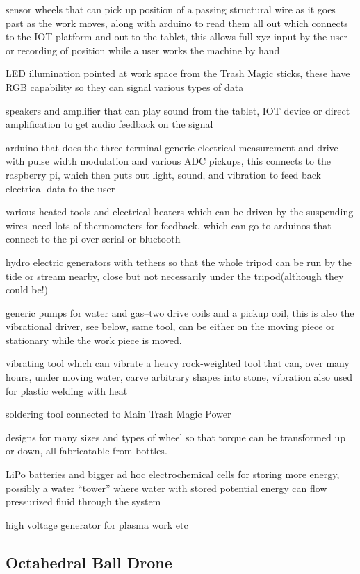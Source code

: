 sensor wheels that can pick up position of a passing structural wire as
it goes past as the work moves, along with arduino to read them all out
which connects to the IOT platform and out to the tablet, this allows
full xyz input by the user or recording of position while a user works
the machine by hand

LED illumination pointed at work space from the Trash Magic sticks,
these have RGB capability so they can signal various types of data

speakers and amplifier that can play sound from the tablet, IOT device
or direct amplification to get audio feedback on the signal

arduino that does the three terminal generic electrical measurement and
drive with pulse width modulation and various ADC pickups, this connects
to the raspberry pi, which then puts out light, sound, and vibration to
feed back electrical data to the user

various heated tools and electrical heaters which can be driven by the
suspending wires--need lots of thermometers for feedback, which can go
to arduinos that connect to the pi over serial or bluetooth

hydro electric generators with tethers so that the whole tripod can be
run by the tide or stream nearby, close but not necessarily under the
tripod(although they could be!)

generic pumps for water and gas--two drive coils and a pickup coil, this
is also the vibrational driver, see below, same tool, can be either on
the moving piece or stationary while the work piece is moved.

vibrating tool which can vibrate a heavy rock-weighted tool that can,
over many hours, under moving water, carve arbitrary shapes into stone,
vibration also used for plastic welding with heat

soldering tool connected to Main Trash Magic Power

designs for many sizes and types of wheel so that torque can be
transformed up or down, all fabricatable from bottles.

LiPo batteries and bigger ad hoc electrochemical cells for storing more
energy, possibly a water ``tower'' where water with stored potential
energy can flow pressurized fluid through the system

high voltage generator for plasma work etc

\subsection{Octahedral Ball Drone}\label{octahedral-ball-drone}

